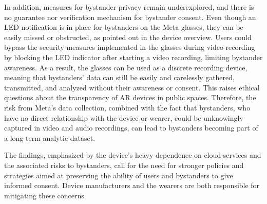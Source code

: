 In addition, measures for bystander privacy remain underexplored, and there is no guarantee nor verification mechanism for bystander consent. Even though an LED notification is in place for bystanders on the Meta glasses, they can be easily missed or obstructed, as pointed out in the device overview. Users could bypass the security measures implemented in the glasses during video recording by blocking the LED indicator after starting a video recording, limiting bystander awareness. As a result, the glasses can be used as a discrete recording device, meaning that bystanders' data can still be easily and carelessly gathered, transmitted, and analyzed without their awareness or consent. This raises ethical questions about the transparency of AR devices in public spaces. Therefore, the risk from Meta's data collection, combined with the fact that bystanders, who have no direct relationship with the device or wearer, could be unknowingly captured in video and audio recordings, can lead to bystanders becoming part of a long-term analytic dataset.

The findings, emphasized by the device's heavy dependence on cloud services and the associated risks to bystanders, call for the need for stronger policies and strategies aimed at preserving the ability of users and bystanders to give informed consent. Device manufacturers and the wearers are both responsible for mitigating these concerns. 

